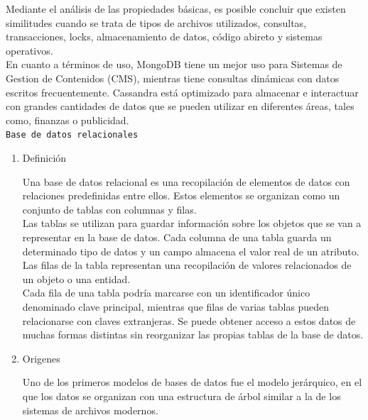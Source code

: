 \documentclass[12pt,a4paper,oneside]{book}
\begin{document}
\begin{enumerate}
\begin{enumerate}
		
		
		
		Mediante el análisis de las propiedades básicas, es posible concluir que existen similitudes cuando se trata de tipos de archivos utilizados, consultas, transacciones, locks, almacenamiento de datos, código abireto y sistemas operativos. \\
		
		En cuanto a términos de uso, MongoDB tiene un mejor uso para Sistemas de Gestion de Contenidos (CMS), mientras tiene consultas dinámicas con datos escritos frecuentemente. Cassandra está optimizado para almacenar e interactuar con grandes cantidades de datos que se pueden utilizar en diferentes áreas, tales como, finanzas o publicidad.\\
		
		\texttt{Base de datos relacionales} \\
		
		\begin{enumerate}
			\item Definición
		
				Una base de datos relacional es una recopilación de elementos de datos con relaciones predefinidas entre ellos. Estos elementos se organizan como un conjunto de tablas con columnas y filas. \\
				
				Las tablas se utilizan para guardar información sobre los objetos que se van a representar en la base de datos. Cada columna de una tabla guarda un determinado tipo de datos y un campo almacena el valor real de un atributo.\\ 
				
				Las filas de la tabla representan una recopilación de valores relacionados de un objeto o una entidad. \\
				
				Cada fila de una tabla podría marcarse con un identificador único denominado clave principal, mientras que filas de varias tablas pueden relacionarse con claves extranjeras. Se puede obtener acceso a estos datos de muchas formas distintas sin reorganizar las propias tablas de la base de datos.\\
				
			\item Origenes
		
				Uno de los primeros modelos de bases de datos fue el modelo jerárquico, en el que los datos se organizan con una estructura de árbol similar a la de los sistemas de archivos modernos. \\
				

\end{enumerate}
\end{enumerate}
\end{enumerate}
\end{document}
